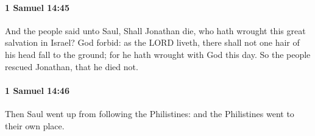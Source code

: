 		\paragraph{1 Samuel 14:45} %
			\label{1SAMUEL-14-45}

			And the people said unto Saul, Shall Jonathan die, who hath wrought this great salvation in Israel? God forbid: as the LORD liveth, there shall not one hair of his head fall to the ground; for he hath wrought with God this day. So the people rescued Jonathan, that he died not.


		\paragraph{1 Samuel 14:46} %
			\label{1SAMUEL-14-46}

			Then Saul went up from following the Philistines: and the Philistines went to their own place.

